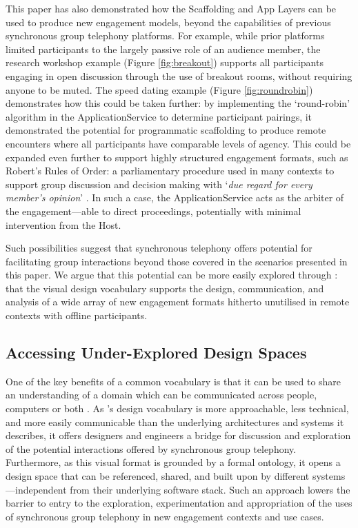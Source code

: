 This paper has also demonstrated how the Scaffolding and App Layers can be used to produce new engagement models, beyond the capabilities of previous synchronous group telephony platforms. For example, while prior platforms limited participants to the largely passive role of an audience member, the research workshop example (Figure \ref{fig:breakout}) supports all participants engaging in open discussion through the use of breakout rooms, without requiring anyone to be muted. The speed dating example (Figure \ref{fig:roundrobin}) demonstrates how this could be taken further: by implementing the `round-robin' algorithm  in the ApplicationService to determine participant pairings, it demonstrated the potential for programmatic scaffolding to produce remote encounters where all participants have comparable levels of agency. This could be expanded even further to support highly structured engagement formats, such as Robert's Rules of Order: a parliamentary procedure used in many contexts to support group discussion and decision making with `\textit{due regard for every member's opinion}' \cite{robert2020}. In such a case, the ApplicationService acts as the arbiter of the engagement---able to direct proceedings, potentially with minimal intervention from the Host. 

Such possibilities suggest that synchronous telephony offers potential for facilitating group interactions beyond those covered in the scenarios presented in this paper. We argue that this potential can be more easily explored through \ONT{}: that the visual design vocabulary supports the design, communication, and analysis of a wide array of new engagement formats hitherto unutilised in remote contexts with offline participants.


\subsection{Accessing Under-Explored Design Spaces}

One of the key benefits of a common vocabulary is that it can be used to share an understanding of a domain which can be communicated across people, computers or both \cite{struder1998}. As \ONT{}'s design vocabulary is more approachable, less technical, and more easily communicable than the underlying architectures and systems it describes, it offers designers and engineers a bridge for discussion and exploration of the potential interactions offered by synchronous group telephony. Furthermore, as this visual format is grounded by a formal ontology, it opens a design space that can be referenced, shared, and built upon by different systems---independent from their underlying software stack. Such an approach lowers the barrier to entry to the exploration, experimentation and appropriation of the uses of synchronous group telephony in new engagement contexts and use cases.

